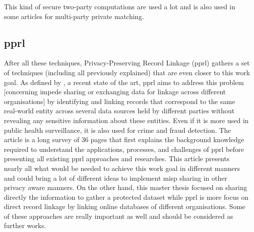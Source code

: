 \documentclass{eplmastersthesis}
\begin{document}
This kind of secure two-party computations are used a lot and is also used in some articles for multi-party private matching. \\

\subsection{\gls{pprl}}
After all these techniques, Privacy-Preserving Record Linkage (\gls{pprl}) gathers a set of techniques (including all previously explained) that are even closer to this work goal. As defined by \cite{vatsalanprivacy}, a recent state of the art, \gls{pprl} aims to address this problem [concerning impede sharing or exchanging data for linkage across different organisations] by identifying and linking records that correspond to the same real-world entity across several data sources held by different parties without revealing any sensitive information about these entities.
Even if it is more used in public health surveillance, it is also used for crime and fraud detection.
The article is a long survey of 36 pages that first explains the background knowledge required to understand the applications, processes, and challenges of \gls{pprl} before presenting all existing \gls{pprl} approaches and researches.
This article presents nearly all what would be needed to achieve this work goal in different manners and could bring a lot of different ideas to implement \gls{misp} sharing in other privacy aware manners.
On the other hand, this master thesis focused on sharing directly the information to gather a protected dataset while \gls{pprl} is more focus on direct record linkage by linking online databases of different organisations. Some of these approaches are really important as well and should be considered as further works.
\end{document}
